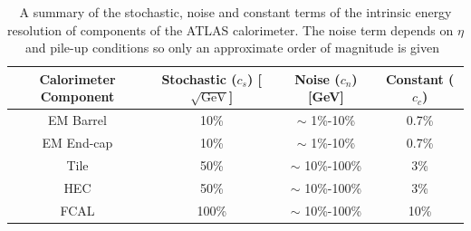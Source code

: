 {\renewcommand{\arraystretch}{1.2}
\begin{table}[!htb]
\centering
\begin{tabular}{|c||c|c|c|}
\hline
Calorimeter Component  & Stochastic ($c_s$) [$\sqrt{\text{GeV}}$]  & Noise  ($c_n$) [GeV]        & Constant ($c_c$)  \\
\hline
EM Barrel              & 10\%                                  & $\sim$ 1\%-10\%                  & 0.7\%       \\
EM End-cap             & 10\%                                  & $\sim$ 1\%-10\%                  & 0.7\%       \\
Tile                   & 50\%                                  & $\sim$ 10\%-100\%                &   3\%       \\
HEC                    & 50\%                                  & $\sim$ 10\%-100\%                &   3\%       \\
FCAL                   & 100\%                                 & $\sim$ 10\%-100\%                &  10\%       \\
\hline
\end{tabular}
\caption[A summary of the stochastic, noise and constant terms of the intrinsic energy resolution of components of the ATLAS calorimeter.]
        {A summary of the stochastic, noise and constant terms of the intrinsic energy resolution of components of the ATLAS calorimeter.
        The noise term depends on $\eta$ and pile-up conditions so only an approximate order of magnitude is given~\cite{det-ATLAS_Exp,det-thesis_lene}}
\label{tab:det-calo_noise}
\end{table}
}



